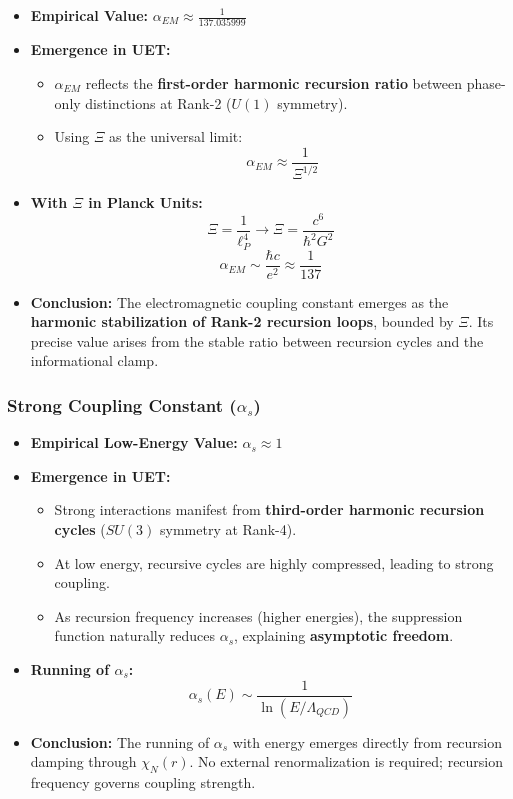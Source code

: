 \documentclass[12pt,a4paper]{article}
\begin{document}
\begin{itemize}
    \item \textbf{Empirical Value:} \(\alpha_{EM} \approx \frac{1}{137.035999}\)
    \item \textbf{Emergence in UET:} 
    \begin{itemize}
        \item \(\alpha_{EM}\) reflects the \textbf{first-order harmonic recursion ratio} between phase-only distinctions at Rank-2 (\(U(1)\) symmetry).
        \item Using \(\Xi\) as the universal limit:
        \[
        \alpha_{EM} \approx \frac{1}{\Xi^{1/2}}
        \]
    \end{itemize}
    \item \textbf{With \(\Xi\) in Planck Units:}
    \[
    \Xi = \frac{1}{\ell_P^4} \rightarrow \Xi = \frac{c^6}{\hbar^2 G^2}
    \]
    \[
    \alpha_{EM} \sim \frac{\hbar c}{e^2} \approx \frac{1}{137}
    \]
    \item \textbf{Conclusion:} The electromagnetic coupling constant emerges as the \textbf{harmonic stabilization of Rank-2 recursion loops}, bounded by \(\Xi\). Its precise value arises from the stable ratio between recursion cycles and the informational clamp.
\end{itemize}

\subsubsection*{Strong Coupling Constant (\(\alpha_s\))}

\begin{itemize}
    \item \textbf{Empirical Low-Energy Value:} \(\alpha_s \approx 1\)
    \item \textbf{Emergence in UET:} 
    \begin{itemize}
        \item Strong interactions manifest from \textbf{third-order harmonic recursion cycles} (\(SU(3)\) symmetry at Rank-4).
        \item At low energy, recursive cycles are highly compressed, leading to strong coupling.
        \item As recursion frequency increases (higher energies), the suppression function naturally reduces \(\alpha_s\), explaining \textbf{asymptotic freedom}.
    \end{itemize}
    \item \textbf{Running of \(\alpha_s\):}
    \[
    \alpha_s(E) \sim \frac{1}{\ln(E / \Lambda_{QCD})}
    \]
    \item \textbf{Conclusion:} The running of \(\alpha_s\) with energy emerges directly from recursion damping through \(\chi_N(r)\). No external renormalization is required; recursion frequency governs coupling strength.
\end{itemize}
\end{document}
